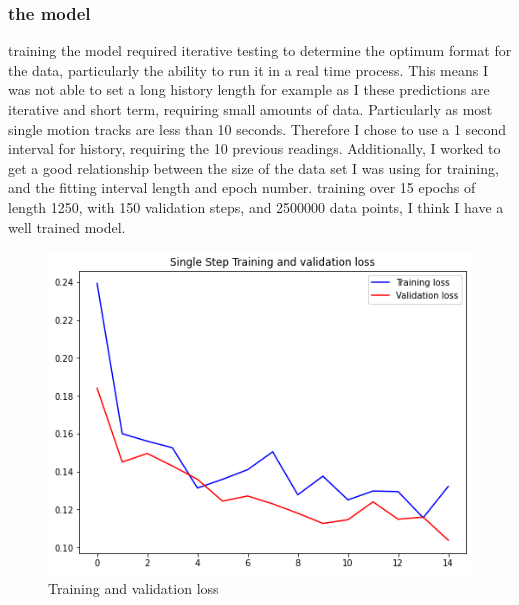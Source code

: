 \documentclass[10pt,a4paper]{article}
\begin{document}
\subsubsection{the model}
training the model required iterative testing to determine the optimum format for the data, particularly the ability to run it in a real time process. This means I was not able to set a long history length for example as I these predictions are iterative and short term, requiring small amounts of data. Particularly as most single motion tracks are less than 10 seconds. Therefore I chose to use a 1 second interval for history, requiring the 10 previous readings. Additionally, I worked to get a good relationship between the size of the data set I was using for training, and the fitting interval length and epoch number. training over 15 epochs of length 1250, with 150 validation steps, and 2500000 data points, I think I have a well trained model.
\begin{figure}[H]
\caption{Training and validation loss} 
\includegraphics[width=\textwidth]{../graphs/training_loss.png}
\end{figure}
\end{document}
